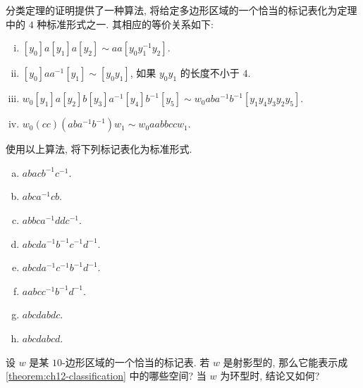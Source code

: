 \begin{exercise}
\label{exercise:ch12-sec77-03}
分类定理的证明提供了一种算法, 将给定多边形区域的一个恰当的标记表化为定理中的 $4$ 种标准形式之一. 其相应的等价关系如下:
\begin{enumerate}[(i)]
\item $[y_{0}]a[y_{1}]a[y_{2}]\sim aa[y_{0}y_{1}^{-1}y_{2}]$.
\item $[y_{0}]aa^{-1}[y_{1}]\sim [y_{0}y_{1}]$, 如果 $y_{0}y_{1}$ 的长度不小于 $4$.
\item $w_{0}[y_{1}]a[y_{2}]b[y_{3}]a^{-1}[y_{4}]b^{-1}[y_{5}]\sim w_{0}aba^{-1}b^{-1}[y_{1}y_{4}y_{3}y_{2}y_{5}]$.
\item $w_{0}(cc)(aba^{-1}b^{-1})w_{1}\sim w_{0}aabbccw_{1}$.
\end{enumerate}
使用以上算法, 将下列标记表化为标准形式.
\begin{enumerate}[(a)]
\item $abacb^{-1}c^{-1}$.
\item $abca^{-1}cb$.
\item $abbca^{-1}ddc^{-1}$.
\item $abcda^{-1}b^{-1}c^{-1}d^{-1}$.
\item $abcda^{-1}c^{-1}b^{-1}d^{-1}$.
\item $aabcc^{-1}b^{-1}d^{-1}$.
\item $abcdabdc$.
\item $abcdabcd$.
\end{enumerate}
\end{exercise}

\begin{exercise}
\label{exercise:ch12-sec77-04}
设 $w$ 是某 $10$-边形区域的一个恰当的标记表. 若 $w$ 是射影型的, 那么它能表示成 \cref{theorem:ch12-classification} 中的哪些空间? 当 $w$ 为环型时, 结论又如何?
\end{exercise}
